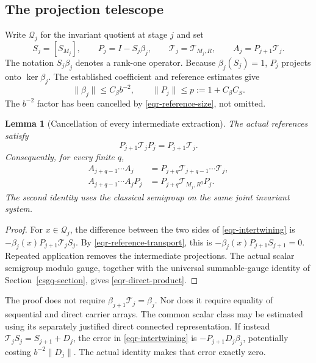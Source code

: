 \documentclass[11pt]{article}
\newtheorem{lemma}[theorem]{Lemma}
\theoremstyle{remark}
\begin{document}
\subsection{The projection telescope}
\label{eqr-projection-section}

Write $\mathcal Q_j$ for the invariant quotient at stage $j$ and set
\begin{equation}
 S_j=[S_{M_j}],\qquad
 P_j=I-S_j\beta_j,\qquad
 \mathcal T_j=\mathcal T_{M_j,R},\qquad
 A_j=P_{j+1}\mathcal T_j.
 \label{eqr-projections}
\end{equation}
The notation $S_j\beta_j$ denotes a rank-one operator.
Because $\beta_j(S_j)=1$, $P_j$ projects onto $\ker\beta_j$.
The established coefficient and reference estimates give
\begin{equation}
 \|\beta_j\|\le C_\beta b^{-2},\qquad
 \|P_j\|\le p:=1+C_\beta C_S.
 \label{eqr-projection-norm}
\end{equation}
The $b^{-2}$ factor has been cancelled by
\eqref{eqr-reference-size}, not omitted.

\begin{lemma}[Cancellation of every intermediate extraction]
\label{eqr-telescope-lemma}
The actual references satisfy
\begin{equation}
 P_{j+1}\mathcal T_jP_j=P_{j+1}\mathcal T_j.
 \label{eqr-intertwining}
\end{equation}
Consequently, for every finite $q$,
\begin{align}
 A_{j+q-1}\cdots A_j
   &=P_{j+q}\mathcal T_{j+q-1}\cdots\mathcal T_j,
       \label{eqr-product}\\
 A_{j+q-1}\cdots A_jP_j
   &=P_{j+q}\mathcal T_{M_j,R^q}P_j.
       \label{eqr-direct-product}
\end{align}
The second identity uses the classical semigroup on the same joint
invariant system.
\end{lemma}
\begin{proof}
For $x\in\mathcal Q_j$, the difference between the two sides of
\eqref{eqr-intertwining} is
$-\beta_j(x)P_{j+1}\mathcal T_jS_j$.
By \eqref{eqr-reference-transport}, this is
$-\beta_j(x)P_{j+1}S_{j+1}=0$.
Repeated application removes the intermediate projections.
The actual scalar semigroup modulo gauge, together with the
universal summable-gauge identity of Section~\ref{csgq-section},
gives \eqref{eqr-direct-product}.
\end{proof}

The proof does not require
$\beta_{j+1}\mathcal T_j=\beta_j$.
Nor does it require equality of sequential and direct carrier arrays.
The common scalar class may be estimated using its separately
justified direct connected representation. If instead
$\mathcal T_jS_j=S_{j+1}+D_j$, the error in
\eqref{eqr-intertwining} is
$-P_{j+1}D_j\beta_j$, potentially costing
$b^{-2}\|D_j\|$. The actual identity makes that error exactly zero.
\end{document}
